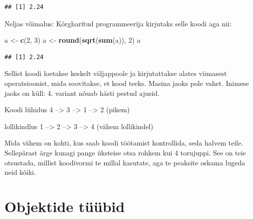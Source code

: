 \documentclass[]{book}
\newenvironment{Shaded}{\begin{snugshade}}{\end{snugshade}}
\newcommand{\KeywordTok}[1]{\textcolor[rgb]{0.13,0.29,0.53}{\textbf{#1}}}
\newcommand{\DecValTok}[1]{\textcolor[rgb]{0.00,0.00,0.81}{#1}}
\newcommand{\StringTok}[1]{\textcolor[rgb]{0.31,0.60,0.02}{#1}}
\newcommand{\OperatorTok}[1]{\textcolor[rgb]{0.81,0.36,0.00}{\textbf{#1}}}
\newcommand{\NormalTok}[1]{#1}
\begin{document}
\begin{Shaded}
\end{Shaded}

\begin{verbatim}
## [1] 2.24
\end{verbatim}

Neljas võimalus: Kõrgharitud programmeerija kirjutaks selle koodi aga
nii:

\begin{Shaded}
\begin{Highlighting}[]
\NormalTok{a <-}\StringTok{ }\KeywordTok{c}\NormalTok{(}\DecValTok{2}\NormalTok{, }\DecValTok{3}\NormalTok{)}
\NormalTok{a <-}\StringTok{ }\KeywordTok{round}\NormalTok{(}\KeywordTok{sqrt}\NormalTok{(}\KeywordTok{sum}\NormalTok{(a)), }\DecValTok{2}\NormalTok{)}
\NormalTok{a}
\end{Highlighting}
\end{Shaded}

\begin{verbatim}
## [1] 2.24
\end{verbatim}

Sellist koodi loetakse keskelt väljappoole ja kirjutattakse alates
viimasest operatsioonist, mida soovitakse, et kood teeks. Masina jaoks
pole vahet. Inimese jaoks on küll: 4. variant nõuab hästi pestud ajusid.

Koodi lühidus 4 --\textgreater{} 3 --\textgreater{} 1 --\textgreater{} 2
(pikem)

lollikindlus 1 --\textgreater{} 2 --\textgreater{} 3 --\textgreater{} 4
(vähem lollikindel)

Mida vähem on kohti, kus saab koodi töötamist kontrollida, seda halvem
teile. Sellepärast ärge kunagi pange üksteise otsa rohkem kui 4
torujuppi. See on teie otsustada, millist koodivormi te millal kasutate,
aga te peaksite oskama lugeda neid kõiki.

\section{Objektide tüübid}\label{objektide-tuubid}
\end{document}
